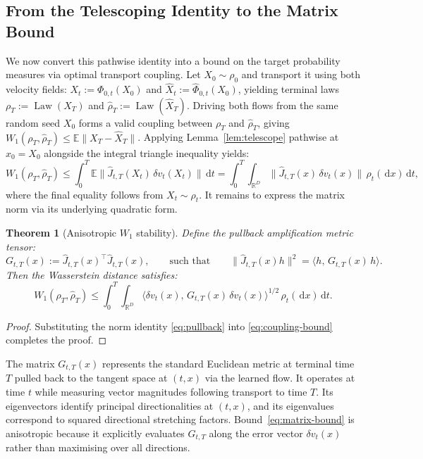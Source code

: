 \documentclass{article}
\DeclareMathOperator{\Law}{Law}
\newcommand{\E}{\mathbb{E}}
\newcommand{\R}{\mathbb{R}}
\newcommand{\dd}{\,\mathrm{d}}
\theoremstyle{plain}
\newtheorem{theorem}{Theorem}[section]
\theoremstyle{definition}
\theoremstyle{remark}
\begin{document}
\subsection{From the Telescoping Identity to the Matrix Bound}
\label{subsec:matrix}

We now convert this pathwise identity into a bound on the target probability measures via optimal transport coupling. Let $X_0 \sim \rho_0$ and transport it using both velocity fields: $X_t := \Phi_{0,t}(X_0)$ and $\hat{X}_t := \hat{\Phi}_{0,t}(X_0)$, yielding terminal laws $\rho_T := \Law(X_T)$ and $\hat{\rho}_T := \Law(\hat{X}_T)$. Driving both flows from the same random seed $X_0$ forms a valid coupling between $\rho_T$ and $\hat{\rho}_T$, giving $W_1(\rho_T,\hat{\rho}_T) \le \E\|X_T - \hat{X}_T\|$. Applying Lemma~\ref{lem:telescope} pathwise at $x_0 = X_0$ alongside the integral triangle inequality yields:
\begin{equation}
  W_1(\rho_T,\hat{\rho}_T)
  \le \int_0^T \E\big\|\hat{J}_{t,T}(X_t)\,\delta v_t(X_t)\big\| \dd t
  = \int_0^T \int_{\R^D} \big\|\hat{J}_{t,T}(x)\,\delta v_t(x)\big\| \, \rho_t(\dd x) \dd t,
  \label{eq:coupling-bound}
\end{equation}
where the final equality follows from $X_t \sim \rho_t$. It remains to express the matrix norm via its underlying quadratic form.

\begin{theorem}[Anisotropic $W_1$ stability]
\label{thm:matrix}
Define the pullback amplification metric tensor:
\begin{equation}
  G_{t,T}(x) := \hat{J}_{t,T}(x)^\top \hat{J}_{t,T}(x),
  \qquad \text{such that} \qquad
  \|\hat{J}_{t,T}(x)h\|^2 = \big\langle h,\, G_{t,T}(x)\, h \big\rangle.
  \label{eq:pullback}
\end{equation}
Then the Wasserstein distance satisfies:
\begin{equation}
  W_1(\rho_T,\hat{\rho}_T)
  \le \int_0^T \int_{\R^D}
  \big\langle \delta v_t(x),\, G_{t,T}(x)\, \delta v_t(x) \big\rangle^{1/2}
  \, \rho_t(\dd x) \dd t.
  \label{eq:matrix-bound}
\end{equation}
\end{theorem}

\begin{proof}
Substituting the norm identity \eqref{eq:pullback} into \eqref{eq:coupling-bound} completes the proof.
\end{proof}

The matrix $G_{t,T}(x)$ represents the standard Euclidean metric at terminal time $T$ pulled back to the tangent space at $(t,x)$ via the learned flow. It operates at time $t$ while measuring vector magnitudes following transport to time $T$. Its eigenvectors identify principal directionalities at $(t,x)$, and its eigenvalues correspond to squared directional stretching factors. Bound~\eqref{eq:matrix-bound} is anisotropic because it explicitly evaluates $G_{t,T}$ along the error vector $\delta v_t(x)$ rather than maximising over all directions.
\end{document}
